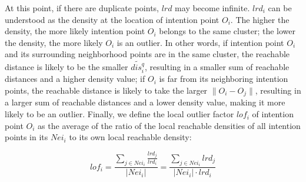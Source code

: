 \documentclass[lettersize,journal]{IEEEtran}
\begin{document}
At this point, if there are duplicate points, $lrd$ may become infinite. $lrd_i$ can be understood as the density at the location of intention point $O_i$. The higher the density, the more likely intention point $O_i$ belongs to the same cluster; the lower the density, the more likely $O_i$ is an outlier. In other words, if intention point $O_i$ and its surrounding neighborhood points are in the same cluster, the reachable distance is likely to be the smaller $\widetilde{dis_i^q}$, resulting in a smaller sum of reachable distances and a higher density value; if $O_i$ is far from its neighboring intention points, the reachable distance is likely to take the larger $\|O_i-O_j\|$, resulting in a larger sum of reachable distances and a lower density value, making it more likely to be an outlier. Finally, we define the local outlier factor $lof_i$ of intention point $O_i$ as the average of the ratio of the local reachable densities of all intention points in its $Nei_i$ to its own local reachable density:

\begin{equation}
    lof_i=\frac{\sum_{j\in Nei_i}\frac{lrd_j}{lrd_i}}{|Nei_i|}=\frac{\sum_{j\in Nei_i} lrd_j}{|Nei_i|\cdot lrd_i}
\end{equation}
\end{document}

